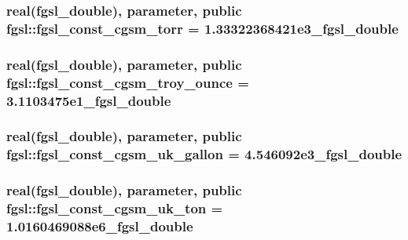 \subsubsection[{fgsl\+\_\+const\+\_\+cgsm\+\_\+torr}]{\setlength{\rightskip}{0pt plus 5cm}real({\bf fgsl\+\_\+double}), parameter, public fgsl\+::fgsl\+\_\+const\+\_\+cgsm\+\_\+torr = 1.\+33322368421e3\+\_\+fgsl\+\_\+double}\label{namespacefgsl_a94ff1d0989beeed6065313b2a63530cb}
\hypertarget{namespacefgsl_aa2e9facb3d97dfb32697727764bbd619}{}
\subsubsection[{fgsl\+\_\+const\+\_\+cgsm\+\_\+troy\+\_\+ounce}]{\setlength{\rightskip}{0pt plus 5cm}real({\bf fgsl\+\_\+double}), parameter, public fgsl\+::fgsl\+\_\+const\+\_\+cgsm\+\_\+troy\+\_\+ounce = 3.\+1103475e1\+\_\+fgsl\+\_\+double}\label{namespacefgsl_aa2e9facb3d97dfb32697727764bbd619}
\hypertarget{namespacefgsl_aaa815df0586e577834ad13d9b6dd8218}{}
\subsubsection[{fgsl\+\_\+const\+\_\+cgsm\+\_\+uk\+\_\+gallon}]{\setlength{\rightskip}{0pt plus 5cm}real({\bf fgsl\+\_\+double}), parameter, public fgsl\+::fgsl\+\_\+const\+\_\+cgsm\+\_\+uk\+\_\+gallon = 4.\+546092e3\+\_\+fgsl\+\_\+double}\label{namespacefgsl_aaa815df0586e577834ad13d9b6dd8218}
\hypertarget{namespacefgsl_abcaa9958fedcc17e52fb560e58639633}{}
\subsubsection[{fgsl\+\_\+const\+\_\+cgsm\+\_\+uk\+\_\+ton}]{\setlength{\rightskip}{0pt plus 5cm}real({\bf fgsl\+\_\+double}), parameter, public fgsl\+::fgsl\+\_\+const\+\_\+cgsm\+\_\+uk\+\_\+ton = 1.\+0160469088e6\+\_\+fgsl\+\_\+double}\label{namespacefgsl_abcaa9958fedcc17e52fb560e58639633}
\hypertarget{namespacefgsl_a6b7f3fbb6b2b1c225cab4719706b6d59}{}
